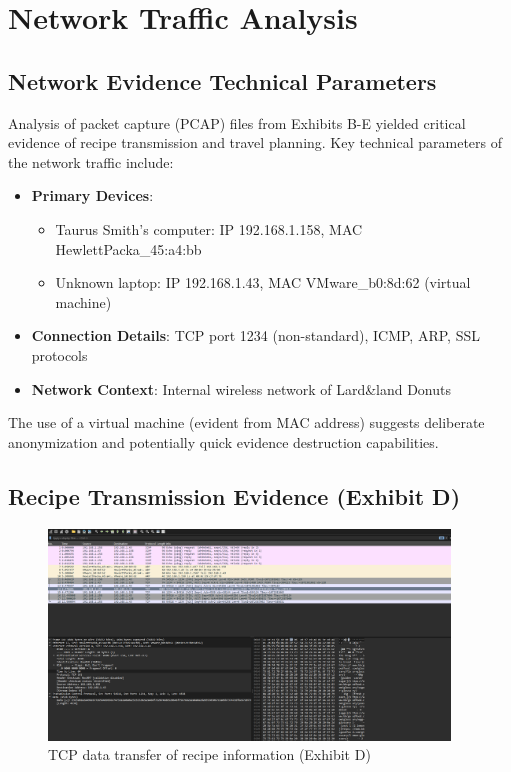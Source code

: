 \chapter{Network Traffic Analysis}

\section{Network Evidence Technical Parameters}
Analysis of packet capture (PCAP) files from Exhibits B-E yielded critical evidence of recipe transmission and travel planning. Key technical parameters of the network traffic include:

\begin{itemize}
    \item \textbf{Primary Devices}: 
        \begin{itemize}
            \item Taurus Smith's computer: IP 192.168.1.158, MAC HewlettPacka\_45:a4:bb
            \item Unknown laptop: IP 192.168.1.43, MAC VMware\_b0:8d:62 (virtual machine)
        \end{itemize}
    \item \textbf{Connection Details}: TCP port 1234 (non-standard), ICMP, ARP, SSL protocols
    \item \textbf{Network Context}: Internal wireless network of Lard\&land Donuts
\end{itemize}

The use of a virtual machine (evident from MAC address) suggests deliberate anonymization and potentially quick evidence destruction capabilities.

\section{Recipe Transmission Evidence (Exhibit D)}

\begin{figure}[htbp]
    \centering
    \includegraphics[width=0.95\textwidth]{images/Network_Analysis/ExhibitD_pcap.png}
    \caption{TCP data transfer of recipe information (Exhibit D)}
    \label{fig:exhibit_d_recipe}
\end{figure}


